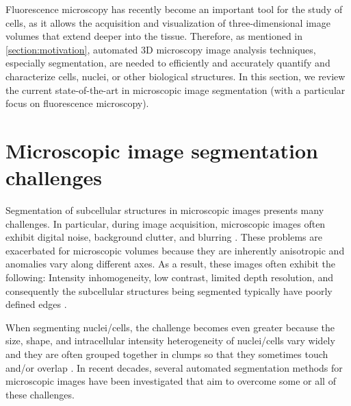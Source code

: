 \cleardoublepage
\label{chapter:state_of_the_art}

Fluorescence microscopy has recently become an important tool for the study of cells, as it allows the acquisition and visualization of three-dimensional image volumes that extend deeper into the tissue. Therefore, as mentioned in \ref{section:motivation}, automated \ac{3D} microscopy image analysis techniques, especially segmentation, are needed to efficiently and accurately quantify and characterize cells, nuclei, or other biological structures. In this section, we review the current state-of-the-art in microscopic image segmentation (with a particular focus on fluorescence microscopy).


\section{Microscopic image segmentation challenges}

Segmentation of subcellular structures in microscopic images presents many challenges. In particular, during image acquisition, microscopic images often exhibit digital noise, background clutter, and blurring \cite{review:robust}. These problems are exacerbated for microscopic volumes because they are inherently anisotropic and anomalies vary along different axes. As a result, these images often exhibit the following: Intensity inhomogeneity, low contrast, limited depth resolution, and consequently the subcellular structures being segmented typically have poorly defined edges \cite{active:inhmo}. 

When segmenting nuclei/cells, the challenge becomes even greater because the size, shape, and intracellular intensity heterogeneity of nuclei/cells vary widely and they are often grouped together in clumps so that they sometimes touch and/or overlap \cite{review:robust}. In recent decades, several automated segmentation methods for microscopic images have been investigated that aim to overcome some or all of these challenges.



